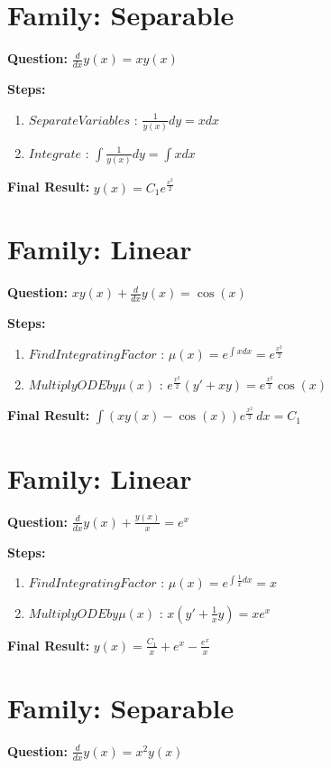 \documentclass{article}
\begin{document}
\section*{Family: Separable}
\textbf{Question:} $\frac{d}{d x} y{\left(x \right)} = x y{\left(x \right)}$

\textbf{Steps:}
\begin{enumerate}
\item $Separate Variables$ :  $\frac{1}{y{\left(x \right)}} dy = x dx$
\item $Integrate$ :  $\int \frac{1}{y{\left(x \right)}} dy = \int x dx$
\end{enumerate}
\textbf{Final Result:} $y{\left(x \right)} = C_{1} e^{\frac{x^{2}}{2}}$

\section*{Family: Linear}
\textbf{Question:} $x y{\left(x \right)} + \frac{d}{d x} y{\left(x \right)} = \cos{\left(x \right)}$

\textbf{Steps:}
\begin{enumerate}
\item $Find Integrating Factor$ :  $\mu(x) = e^{\int x dx} = e^{\frac{x^{2}}{2}}$
\item $Multiply ODE by \mu(x)$ :  $e^{\frac{x^{2}}{2}}(y' + xy) = e^{\frac{x^{2}}{2}} \cos{\left(x \right)}$
\end{enumerate}
\textbf{Final Result:} $\int \left(x y{\left(x \right)} - \cos{\left(x \right)}\right) e^{\frac{x^{2}}{2}}\, dx = C_{1}$

\section*{Family: Linear}
\textbf{Question:} $\frac{d}{d x} y{\left(x \right)} + \frac{y{\left(x \right)}}{x} = e^{x}$

\textbf{Steps:}
\begin{enumerate}
\item $Find Integrating Factor$ :  $\mu(x) = e^{\int \frac{1}{x} dx} = x$
\item $Multiply ODE by \mu(x)$ :  $x(y' + \frac{1}{x}y) = x e^{x}$
\end{enumerate}
\textbf{Final Result:} $y{\left(x \right)} = \frac{C_{1}}{x} + e^{x} - \frac{e^{x}}{x}$

\section*{Family: Separable}
\textbf{Question:} $\frac{d}{d x} y{\left(x \right)} = x^{2} y{\left(x \right)}$
\end{document}
